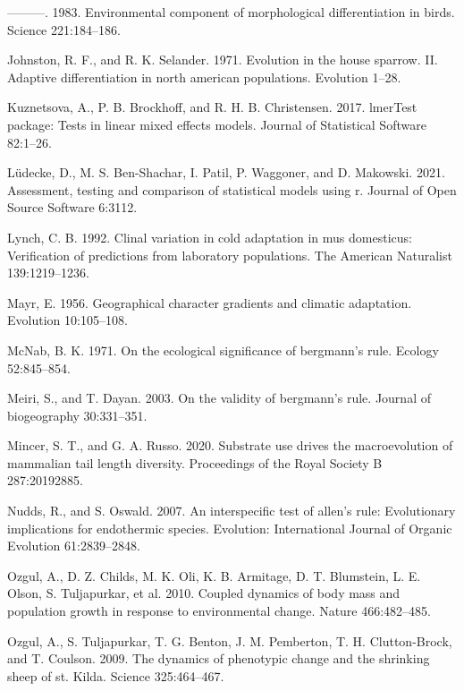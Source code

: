 \documentclass[]{article}
\begin{document}
\leavevmode\hypertarget{ref-James1983}{}%
---------. 1983. Environmental component of morphological
differentiation in birds. Science 221:184--186.

\leavevmode\hypertarget{ref-Johnston1971}{}%
Johnston, R. F., and R. K. Selander. 1971. Evolution in the house
sparrow. II. Adaptive differentiation in north american populations.
Evolution 1--28.

\leavevmode\hypertarget{ref-Kuznetsova2017}{}%
Kuznetsova, A., P. B. Brockhoff, and R. H. B. Christensen. 2017.
lmerTest package: Tests in linear mixed effects models. Journal of
Statistical Software 82:1--26.

\leavevmode\hypertarget{ref-Luxfcdecke2021}{}%
Lüdecke, D., M. S. Ben-Shachar, I. Patil, P. Waggoner, and D. Makowski.
2021. Assessment, testing and comparison of statistical models using r.
Journal of Open Source Software 6:3112.

\leavevmode\hypertarget{ref-Lynch1992}{}%
Lynch, C. B. 1992. Clinal variation in cold adaptation in mus
domesticus: Verification of predictions from laboratory populations. The
American Naturalist 139:1219--1236.

\leavevmode\hypertarget{ref-Mayr1956}{}%
Mayr, E. 1956. Geographical character gradients and climatic adaptation.
Evolution 10:105--108.

\leavevmode\hypertarget{ref-McNab1971}{}%
McNab, B. K. 1971. On the ecological significance of bergmann's rule.
Ecology 52:845--854.

\leavevmode\hypertarget{ref-Meiri2003}{}%
Meiri, S., and T. Dayan. 2003. On the validity of bergmann's rule.
Journal of biogeography 30:331--351.

\leavevmode\hypertarget{ref-Mincer2020}{}%
Mincer, S. T., and G. A. Russo. 2020. Substrate use drives the
macroevolution of mammalian tail length diversity. Proceedings of the
Royal Society B 287:20192885.

\leavevmode\hypertarget{ref-Nudds2007}{}%
Nudds, R., and S. Oswald. 2007. An interspecific test of allen's rule:
Evolutionary implications for endothermic species. Evolution:
International Journal of Organic Evolution 61:2839--2848.

\leavevmode\hypertarget{ref-Ozgul2010}{}%
Ozgul, A., D. Z. Childs, M. K. Oli, K. B. Armitage, D. T. Blumstein, L.
E. Olson, S. Tuljapurkar, et al. 2010. Coupled dynamics of body mass and
population growth in response to environmental change. Nature
466:482--485.

\leavevmode\hypertarget{ref-Ozgul2009}{}%
Ozgul, A., S. Tuljapurkar, T. G. Benton, J. M. Pemberton, T. H.
Clutton-Brock, and T. Coulson. 2009. The dynamics of phenotypic change
and the shrinking sheep of st. Kilda. Science 325:464--467.
\end{document}
